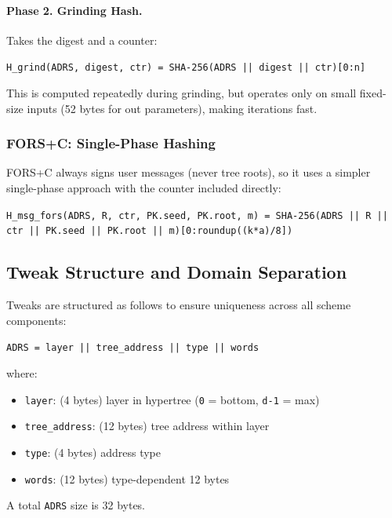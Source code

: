 \paragraph{Phase 2. Grinding Hash.} Takes the digest and a counter:
\begin{center}
    \texttt{H\_grind(ADRS, digest, ctr) = SHA-256(ADRS || digest || ctr)[0:n]}
\end{center}
This is computed repeatedly during grinding, but operates only on small fixed-size inputs (52 bytes for out parameters), making iterations fast.

\subsubsection{FORS+C: Single-Phase Hashing}
FORS+C always signs user messages (never tree roots), so it uses a simpler single-phase approach with the counter included directly:
\begin{center}
    \texttt{H\_msg\_fors(ADRS, R, ctr, PK.seed, PK.root, m) = SHA-256(ADRS || R || ctr || PK.seed || PK.root || m)[0:roundup((k*a)/8])}
\end{center}

\subsection{Tweak Structure and Domain Separation}
Tweaks are structured as follows to ensure uniqueness across all scheme components:

\begin{center}
\texttt{ADRS = layer || tree\_address || type || words}
\end{center}
where: 
\begin{itemize}
    \item[] \texttt{layer}: (4 bytes) layer in hypertree (\texttt{0} = bottom, \texttt{d-1} = max)
    \item[] \texttt{tree\_address}: (12 bytes) tree address within layer
    \item[] \texttt{type}: (4 bytes) address type
    \item[] \texttt{words}: (12 bytes) type-dependent 12 bytes
\end{itemize}
A total \texttt{ADRS} size is 32 bytes.

